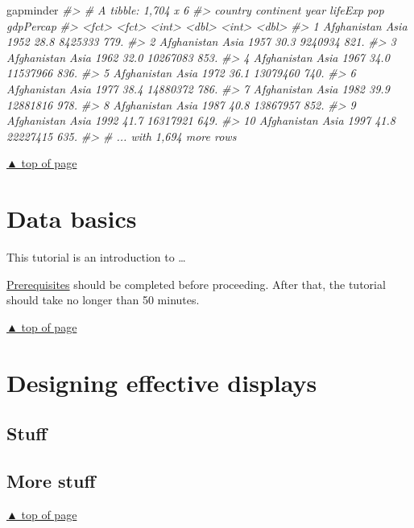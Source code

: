 \documentclass[
]{book}
\newenvironment{Shaded}{\begin{snugshade}}{\end{snugshade}}
\newcommand{\CommentTok}[1]{\textcolor[rgb]{0.56,0.35,0.01}{\textit{#1}}}
\newcommand{\NormalTok}[1]{#1}
\begin{document}
\begin{Shaded}
\begin{Highlighting}[]
\NormalTok{gapminder}
\CommentTok{\#\textgreater{} \# A tibble: 1,704 x 6}
\CommentTok{\#\textgreater{}    country     continent  year lifeExp      pop gdpPercap}
\CommentTok{\#\textgreater{}    \textless{}fct\textgreater{}       \textless{}fct\textgreater{}     \textless{}int\textgreater{}   \textless{}dbl\textgreater{}    \textless{}int\textgreater{}     \textless{}dbl\textgreater{}}
\CommentTok{\#\textgreater{}  1 Afghanistan Asia       1952    28.8  8425333      779.}
\CommentTok{\#\textgreater{}  2 Afghanistan Asia       1957    30.3  9240934      821.}
\CommentTok{\#\textgreater{}  3 Afghanistan Asia       1962    32.0 10267083      853.}
\CommentTok{\#\textgreater{}  4 Afghanistan Asia       1967    34.0 11537966      836.}
\CommentTok{\#\textgreater{}  5 Afghanistan Asia       1972    36.1 13079460      740.}
\CommentTok{\#\textgreater{}  6 Afghanistan Asia       1977    38.4 14880372      786.}
\CommentTok{\#\textgreater{}  7 Afghanistan Asia       1982    39.9 12881816      978.}
\CommentTok{\#\textgreater{}  8 Afghanistan Asia       1987    40.8 13867957      852.}
\CommentTok{\#\textgreater{}  9 Afghanistan Asia       1992    41.7 16317921      649.}
\CommentTok{\#\textgreater{} 10 Afghanistan Asia       1997    41.8 22227415      635.}
\CommentTok{\#\textgreater{} \# ... with 1,694 more rows}
\end{Highlighting}
\end{Shaded}

\protect\hyperlink{start-with-R}{▲ top of page}

\hypertarget{data-basics}{%
\chapter{Data basics}\label{data-basics}}

This tutorial is an introduction to \ldots{}

\protect\hyperlink{prerequisites}{Prerequisites} should be completed before proceeding. After that, the tutorial should take no longer than 50 minutes.

\protect\hyperlink{start-with-R}{▲ top of page}

\hypertarget{display-design}{%
\chapter{Designing effective displays}\label{display-design}}

\hypertarget{stuff}{%
\section{Stuff}\label{stuff}}

\hypertarget{more-stuff}{%
\section{More stuff}\label{more-stuff}}

\protect\hyperlink{display-design}{▲ top of page}

  
\end{document}
